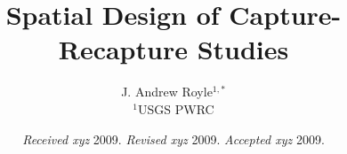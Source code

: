 \documentclass[useAMS,referee]{biom}
\title[Spatial Capture-Recapture]{
Spatial Design of Capture-Recapture Studies
}
\author{
J. Andrew Royle$^{1,*}$\email{aroyle@usgs.gov}
\\
$^{1}$USGS PWRC \\
}
\begin{document}
\linenumbers


\date{{\it Received xyz} 2009. {\it Revised xyz} 2009.  {\it
Accepted xyz} 2009.}



\pagerange{\pageref{firstpage}--\pageref{lastpage}} 




\label{firstpage}


\begin{abstract}
\end{abstract}
%

\begin{keywords}
\end{keywords}

\end{document}
